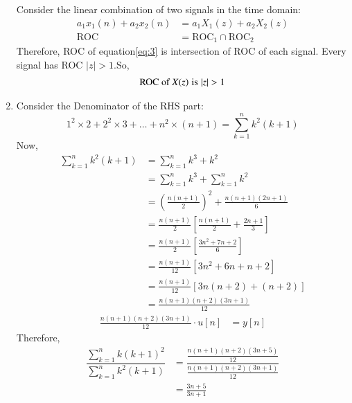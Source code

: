 \documentclass[journal,12pt,twocolumn]{IEEEtran}
\theoremstyle{remark}
\begin{document}
\begin{enumerate}[label=\alph*)]
Consider the linear combination of two signals in the time domain:
\begin{align}
    a_1 x_1(n) + a_2 x_2(n) &= a_1 X_1(z) + a_2 X_2(z) \label{eq:combined_signal}\\
    \text{ROC} &= \text{ROC}_1 \cap \text{ROC}_2 \label{eq:roc_intersection}
\end{align}
\vspace{1.5pt}
Therefore, ROC of equation\eqref{eq:3} is intersection of ROC of each signal. Every signal has ROC $|z|>1$.So,\\
\begin{align}
    \text{ROC of $X(z)$} \text{\hspace{3pt}is\hspace{3pt}} |z|>1
\end{align}
  \item Consider the Denominator of the RHS part:
\begin{equation}
    1^2\times2 + 2^2\times3 +\dots + n^2\times(n+1) = \sum_{k=1}^n k^2(k+1)
\end{equation}
Now,\\
\begin{align}
     \sum_{k=1}^n k^2(k+1) &= \sum_{k=1}^n k^3+k^2\\
                           &=  \sum_{k=1}^n k^3 + \sum_{k=1}^n k^2\\
                           &=  \left(\frac{n(n+1)}{2}\right)^{\scriptstyle 2}+\frac{n(n+1)(2n+1)}{6}\\ 
                           &= \frac{n(n+1)}{2}\left[\frac{n(n+1)}{2} +\frac{2n+1}{3}\right]\\
                           &= \frac{n(n+1)}{2}\left[\frac{3n^2+7n+2}{6}\right]\\
                           &= \frac{n(n+1)}{12}\left[3n^2+6n + n+2\right]\\
                           &= \frac{n(n+1)}{12}\left[3n(n+2)+(n+2)\right]\\
                           &= \frac{n(n+1)(n+2)(3n+1)}{12}
\end{align}
\begin{align}
    \frac{n(n+1)(n+2)(3n+1)}{12}\cdot u[n] &= y[n]
\end{align}
\vspace{1cm}
Therefore,
\begin{align}
     \dfrac{ \sum_{k=1}^n k(k+1)^2 }{\sum_{k=1}^n k^2(k+1)} &= \dfrac{\frac{n(n+1)(n+2)(3n+5)}{12}}{\frac{n(n+1)(n+2)(3n+1)}{12}}\\
                                                            &= \frac{3n+5}{3n+1}
\end{align}
\vspace{0.7cm}


\end{enumerate}
\end{document}
